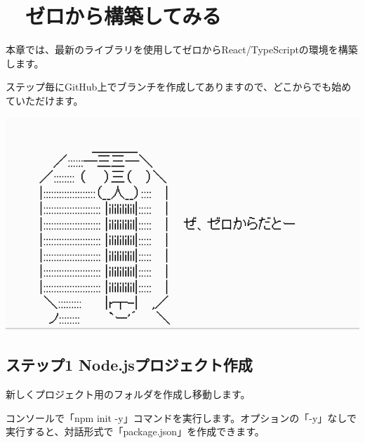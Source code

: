 \section{　ゼロから構築してみる}
\keeplastskip{
  \label{sec:2-2}
  \label{sec-04-start}
  \par\nobreak
}

本章では、最新のライブラリを使用してゼロからReact/TypeScriptの環境を構築します。

\vspace*{\baselineskip}

ステップ毎にGitHub上でブランチを作成してありますので、どこからでも始めていただけます。

\begin{reviewimage}[H]%
\includegraphics[width=0.4\maxwidth]{./images/02-create-react-app/fromScratch.png}%
\label{image:02-create-react-app:fromScratch}
\end{reviewimage}

\subsection{ステップ1 Node.jsプロジェクト作成}
\keeplastskip{
  \label{sec:2-2-1}
  \label{sec-04-node_init}
  \par\nobreak
}

新しくプロジェクト用のフォルダを作成し移動します。

コンソールで「npm init {-}y」コマンドを実行します。オプションの「{-}y」なしで実行すると、対話形式で「package.json」を作成できます。

